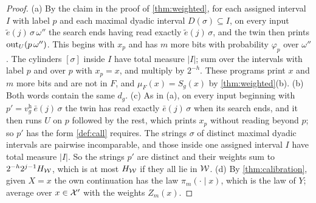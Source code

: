 \begin{proof}
(a) By the claim in the proof of \cref{thm:weighted}, for each assigned interval $I$ with label $p$ and each
maximal dyadic interval $D(\sigma)\subseteq I$, on every input $\tilde e(j)\,\sigma\,\omega''$ the search ends
having read exactly $\tilde e(j)\,\sigma$, and the twin then prints $\mathrm{out}_U(p\,\omega'')$. This begins with
$x_p$ and has $m$ more bits with probability $\varphi_p$ over $\omega''$. The cylinders $[\sigma]$ inside $I$
have total measure $|I|$; sum over the intervals with label $p$ and over $p$ with $x_p=x$, and multiply by
$2^{-h}$. These programs print $x$ and $m$ more bits and are not in $F$, and $\mu_F(x)=S_g(x)$ by
\cref{thm:weighted}(b). (b) Both words contain the same $d_g$. (c) As in (a), on every input beginning with
$p'=v^{\mathrm h}_g\,\bar e(j)\,\sigma$ the twin has read exactly $\bar e(j)\,\sigma$ when its search ends,
and it then runs $U$ on $p$ followed by the rest, which prints $x_p$ without reading beyond $p$; so $p'$ has
the form \cref{def:call} requires. The strings $\sigma$ of distinct maximal dyadic intervals are pairwise
incomparable, and those inside one assigned interval $I$ have total measure $|I|$. So the strings $p'$ are
distinct and their weights sum to $2^{-h}2^{j-1}H_{\mathcal W}$, which is at most $H_{\mathcal W}$ if they all lie in $\mathcal W$.
(d) By \cref{thm:calibration}, given $X=x$ the own continuation has the law $\pi_m(\cdot\mid x)$, which is the
law of $Y$; average over $x\in\mathcal X'$ with the weights $Z_m(x)$.
\end{proof}

